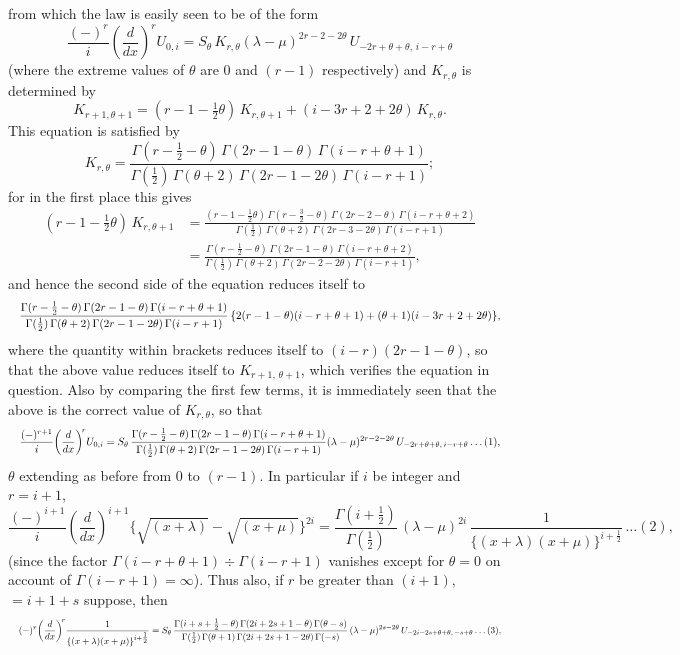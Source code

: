 \documentclass[11pt]{article}
\begin{document}
\noindent from which the law is easily seen to be of the form
\[
  \frac{(-)^{r}}{i}\!\left(\frac{d}{dx}\right)^{\!r}\!U_{0,i} = S_\theta\,K_{r,\theta}(\lambda-\mu)^{2r-2-2\theta}\,U_{-2r+\theta+\theta,\,i-r+\theta}
\]
(where the extreme values of $\theta$ are $0$ and $(r-1)$ respectively) and $K_{r,\theta}$ is determined by
\[
  K_{r+1,\theta+1} = (r-1-\tfrac{1}{2}\theta)\,K_{r,\theta+1} + (i-3r+2+2\theta)\,K_{r,\theta}.
\]
This equation is satisfied by
\[
  K_{r,\theta} = \frac{\Gamma(r-\tfrac{1}{2}-\theta)\,\Gamma(2r-1-\theta)\,\Gamma(i-r+\theta+1)}
                       {\Gamma(\tfrac{1}{2})\,\Gamma(\theta+2)\,\Gamma(2r-1-2\theta)\,\Gamma(i-r+1)};
\]
for in the first place this gives
\begin{align*}
  (r-1-\tfrac{1}{2}\theta)\,K_{r,\theta+1}
    &= \frac{(r-1-\tfrac{1}{2}\theta)\,\Gamma(r-\tfrac{3}{2}-\theta)\,\Gamma(2r-2-\theta)\,\Gamma(i-r+\theta+2)}
            {\Gamma(\tfrac{1}{2})\,\Gamma(\theta+2)\,\Gamma(2r-3-2\theta)\,\Gamma(i-r+1)} \\
    &= \frac{\Gamma(r-\tfrac{1}{2}-\theta)\,\Gamma(2r-1-\theta)\,\Gamma(i-r+\theta+2)}
            {\Gamma(\tfrac{1}{2})\,\Gamma(\theta+2)\,\Gamma(2r-2-2\theta)\,\Gamma(i-r+1)},
\end{align*}
and hence the second side of the equation reduces itself to
\[
  \resizebox{\textwidth}{!}{$\displaystyle
  \frac{\Gamma(r-\tfrac{1}{2}-\theta)\,\Gamma(2r-1-\theta)\,\Gamma(i-r+\theta+1)}
       {\Gamma(\tfrac{1}{2})\,\Gamma(\theta+2)\,\Gamma(2r-1-2\theta)\,\Gamma(i-r+1)}
   \,\{2(r-1-\theta)(i-r+\theta+1) + (\theta+1)(i-3r+2+2\theta)\},
  $}
\]
where the quantity within brackets reduces itself to $(i-r)(2r-1-\theta)$, so that the above value reduces itself to $K_{r+1,\,\theta+1}$, which verifies the equation in question. Also by comparing the first few terms, it is immediately seen that the above is the correct value of $K_{r,\theta}$, so that
\[
  \resizebox{\textwidth}{!}{$\displaystyle
  \frac{(-)^{r+1}}{i}\!\left(\frac{d}{dx}\right)^{\!r}\!U_{0,i}
     = S_\theta\,\frac{\Gamma(r-\tfrac{1}{2}-\theta)\,\Gamma(2r-1-\theta)\,\Gamma(i-r+\theta+1)}
                       {\Gamma(\tfrac{1}{2})\,\Gamma(\theta+2)\,\Gamma(2r-1-2\theta)\,\Gamma(i-r+1)}
     (\lambda-\mu)^{2r-2-2\theta}\,U_{-2r+\theta+\theta,\,i-r+\theta} \dots (1),
  $}
\]
$\theta$ extending as before from $0$ to $(r-1)$. In particular if $i$ be integer and $r = i+1$,
\[
  \frac{(-)^{i+1}}{i}\!\left(\frac{d}{dx}\right)^{\!i+1}\!\{\sqrt{(x+\lambda)} - \sqrt{(x+\mu)}\}^{2i}
     = \frac{\Gamma(i+\tfrac{1}{2})}{\Gamma(\tfrac{1}{2})}\,(\lambda-\mu)^{2i}\,\frac{1}{\{(x+\lambda)(x+\mu)\}^{i+\tfrac{1}{2}}}\,\dots(2),
\]
(since the factor $\Gamma(i-r+\theta+1) \div \Gamma(i-r+1)$ vanishes except for $\theta=0$ on account of $\Gamma(i-r+1) = \infty$). Thus also, if $r$ be greater than $(i+1)$, $= i+1+s$ suppose, then
\[
  \resizebox{\textwidth}{!}{$\displaystyle
  (-)^{r}\!\left(\frac{d}{dx}\right)^{\!r}\!\frac{1}{\{(x+\lambda)(x+\mu)\}^{i+\tfrac{1}{2}}}
    = S_\theta\,\frac{\Gamma(i+s+\tfrac{1}{2}-\theta)\,\Gamma(2i+2s+1-\theta)\,\Gamma(\theta-s)}{\Gamma(\tfrac{1}{2})\,\Gamma(\theta+1)\,\Gamma(2i+2s+1-2\theta)\,\Gamma(-s)}
    \,(\lambda-\mu)^{2s-2\theta}\,U_{-2i-2s+\theta+\theta,\,-s+\theta}\dots (3),
  $}
\]
\end{document}
